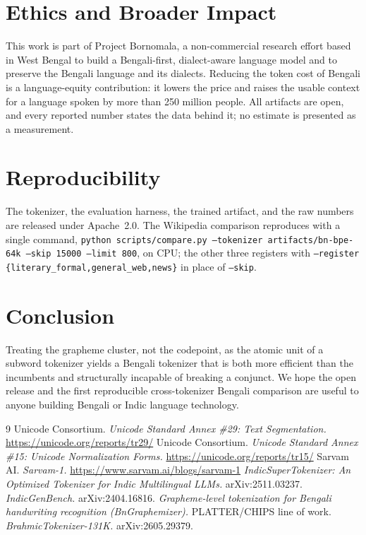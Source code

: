 \documentclass[11pt]{article}
\begin{document}
\section{Ethics and Broader Impact}
This work is part of Project Bornomala, a non-commercial research effort based in
West Bengal to build a Bengali-first, dialect-aware language model and to preserve
the Bengali language and its dialects. Reducing the token cost of Bengali is a
language-equity contribution: it lowers the price and raises the usable context
for a language spoken by more than 250 million people. All artifacts are open, and
every reported number states the data behind it; no estimate is presented as a
measurement.

\section{Reproducibility}
The tokenizer, the evaluation harness, the trained artifact, and the raw numbers
are released under Apache~2.0. The Wikipedia comparison reproduces with a single
command, \texttt{python scripts/compare.py --tokenizer artifacts/bn-bpe-64k
--skip 15000 --limit 800}, on CPU; the other three registers with
\texttt{--register \{literary\_formal,general\_web,news\}} in place of
\texttt{--skip}.

\section{Conclusion}
Treating the grapheme cluster, not the codepoint, as the atomic unit of a subword
tokenizer yields a Bengali tokenizer that is both more efficient than the
incumbents and structurally incapable of breaking a conjunct. We hope the open
release and the first reproducible cross-tokenizer Bengali comparison are useful
to anyone building Bengali or Indic language technology.

\begin{thebibliography}{9}
\small
{} Unicode Consortium. \emph{Unicode Standard Annex \#29: Text Segmentation.} \url{https://unicode.org/reports/tr29/}
 Unicode Consortium. \emph{Unicode Standard Annex \#15: Unicode Normalization Forms.} \url{https://unicode.org/reports/tr15/}
 Sarvam AI. \emph{Sarvam-1.} \url{https://www.sarvam.ai/blogs/sarvam-1}
 \emph{IndicSuperTokenizer: An Optimized Tokenizer for Indic Multilingual LLMs.} arXiv:2511.03237.
 \emph{IndicGenBench.} arXiv:2404.16816.
 \emph{Grapheme-level tokenization for Bengali handwriting recognition (BnGraphemizer).} PLATTER/CHIPS line of work.
 \emph{BrahmicTokenizer-131K.} arXiv:2605.29379.
\end{thebibliography}
\end{document}
